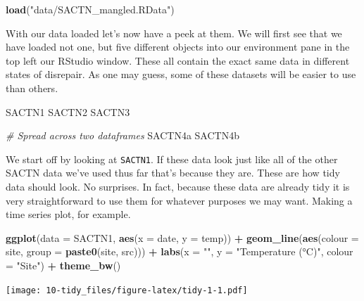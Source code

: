 \documentclass[]{book}
\newenvironment{Shaded}{\begin{snugshade}}{\end{snugshade}}
\newcommand{\KeywordTok}[1]{\textcolor[rgb]{0.13,0.29,0.53}{\textbf{#1}}}
\newcommand{\DataTypeTok}[1]{\textcolor[rgb]{0.13,0.29,0.53}{#1}}
\newcommand{\StringTok}[1]{\textcolor[rgb]{0.31,0.60,0.02}{#1}}
\newcommand{\CommentTok}[1]{\textcolor[rgb]{0.56,0.35,0.01}{\textit{#1}}}
\newcommand{\OperatorTok}[1]{\textcolor[rgb]{0.81,0.36,0.00}{\textbf{#1}}}
\newcommand{\NormalTok}[1]{#1}
\theoremstyle{definition}
\theoremstyle{definition}
\theoremstyle{definition}
\theoremstyle{remark}
\begin{document}
\begin{Shaded}
\begin{Highlighting}[]
\KeywordTok{load}\NormalTok{(}\StringTok{"data/SACTN_mangled.RData"}\NormalTok{)}
\end{Highlighting}
\end{Shaded}

With our data loaded let's now have a peek at them. We will first see
that we have loaded not one, but five different objects into our
environment pane in the top left our RStudio window. These all contain
the exact same data in different states of disrepair. As one may guess,
some of these datasets will be easier to use than others.

\begin{Shaded}
\begin{Highlighting}[]
\NormalTok{SACTN1}
\NormalTok{SACTN2}
\NormalTok{SACTN3}

\CommentTok{# Spread across two dataframes}
\NormalTok{SACTN4a}
\NormalTok{SACTN4b}
\end{Highlighting}
\end{Shaded}

We start off by looking at \texttt{SACTN1}. If these data look just like
all of the other SACTN data we've used thus far that's because they are.
These are how tidy data should look. No surprises. In fact, because
these data are already tidy it is very straightforward to use them for
whatever purposes we may want. Making a time series plot, for example.

\begin{Shaded}
\begin{Highlighting}[]
\KeywordTok{ggplot}\NormalTok{(}\DataTypeTok{data =}\NormalTok{ SACTN1, }\KeywordTok{aes}\NormalTok{(}\DataTypeTok{x =}\NormalTok{ date, }\DataTypeTok{y =}\NormalTok{ temp)) }\OperatorTok{+}
\StringTok{  }\KeywordTok{geom_line}\NormalTok{(}\KeywordTok{aes}\NormalTok{(}\DataTypeTok{colour =}\NormalTok{ site, }\DataTypeTok{group =} \KeywordTok{paste0}\NormalTok{(site, src))) }\OperatorTok{+}
\StringTok{  }\KeywordTok{labs}\NormalTok{(}\DataTypeTok{x =} \StringTok{""}\NormalTok{, }\DataTypeTok{y =} \StringTok{"Temperature (°C)"}\NormalTok{, }\DataTypeTok{colour =} \StringTok{"Site"}\NormalTok{) }\OperatorTok{+}
\StringTok{  }\KeywordTok{theme_bw}\NormalTok{()}
\end{Highlighting}
\end{Shaded}

\texttt{[image: 10-tidy\_files/figure-latex/tidy-1-1.pdf]}
\end{document}
